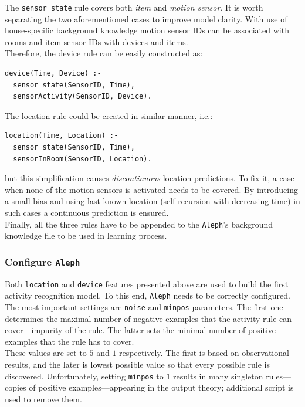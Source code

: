 \documentclass[10pt, a4paper, pdflatex, leqno, twoside, openright]{report}
\begin{document}
The \texttt{sensor\_state} rule covers both \emph{item} and \emph{motion sensor}. It is worth separating the two aforementioned cases to improve model clarity. With use of house-specific background knowledge motion sensor IDs can be associated with rooms and item sensor IDs with devices and items.\\
Therefore, the device rule can be easily constructed as:\\
\begin{verbatim}
device(Time, Device) :-
  sensor_state(SensorID, Time),
  sensorActivity(SensorID, Device).
\end{verbatim}
The location rule could be created in similar manner, i.e.:\\
\begin{verbatim}
location(Time, Location) :-
  sensor_state(SensorID, Time),
  sensorInRoom(SensorID, Location).
\end{verbatim}
but this simplification causes \emph{discontinuous} location predictions. To fix it, a case when none of the motion sensors is activated needs to be covered. By introducing a small bias and using last known location (self-recursion with decreasing time) in such cases a continuous prediction is ensured.\\

Finally, all the three rules have to be appended to the \texttt{Aleph}'s background knowledge file to be used in learning process.

      \subsubsection{Configure \texttt{Aleph}}
Both \texttt{location} and \texttt{device} features presented above are used to build the first activity recognition model. To this end, \texttt{Aleph} needs to be correctly configured.\\
The most important settings are \texttt{noise} and \texttt{minpos} parameters. The first one determines the maximal number of negative examples that the activity rule can cover---impurity of the rule. The latter sets the minimal number of positive examples that the rule has to cover.\\
These values are set to $5$ and $1$ respectively. The first is based on observational results, and the later is lowest possible value so that every possible rule is discovered. Unfortunately, setting \texttt{minpos} to $1$ results in many singleton rules---copies of positive examples---appearing in the output theory; additional script is used to remove them.\\
\end{document}

